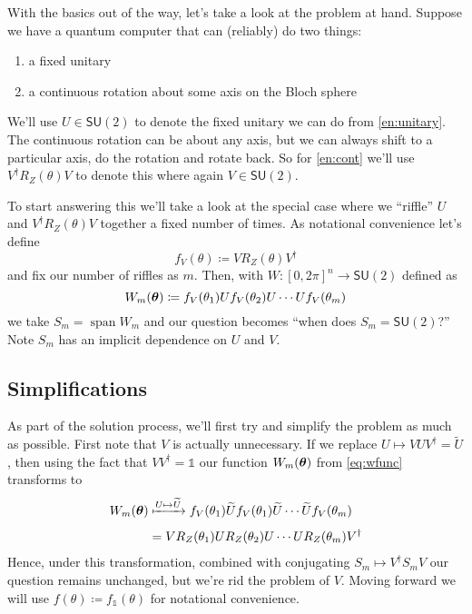 \documentclass[12pt,dvipsnames]{article}
\newcommand{\SU}[1]{\mathsf{SU} (#1)}
\newcommand{\1}{\mathbb{1}}
\DeclareMathOperator{\vspan}{span}
\theoremstyle{plain}
\begin{document}
With the basics out of the way, let's take a look at the problem at hand.
Suppose we have a quantum computer that can (reliably) do two things:
\begin{enumerate}
    \item a fixed unitary\label{en:unitary}
    \item a continuous rotation about some axis on the Bloch sphere\label{en:cont}
\end{enumerate}
We'll use $U\in \SU{2}$ to denote the fixed unitary we can do from \cref{en:unitary}. The continuous rotation can be about any axis, but we can always shift to a particular axis, do the rotation and rotate back. So for \cref{en:cont} we'll use $V^\dagger R_Z(\theta)V$ to denote this where again $V\in \SU{2}$.

To start answering this we'll take a look at the special case where we ``riffle'' $U$ and $V^\dagger R_Z(\theta)V$ together a fixed number of times. As notational convenience let's define
\begin{equation}
    f_V(\theta)\coloneqq VR_Z(\theta)V^\dagger
\end{equation}
and fix our number of riffles as $m$. Then, with $W:[0, 2\pi]^n\to\SU{2}$ defined as
\begin{equation}\label{eq:wfunc}
    W_m(\vb*{\theta}) \coloneqq f_V(\theta_1)Uf_V(\theta_2)U\cdots U f_V(\theta_m)
\end{equation}
we take $S_m = \vspan W_m$ and our question becomes ``when does $S_{m} = \SU{2}$?'' Note $S_m$ has an implicit dependence on $U$ and $V$.

\subsection{Simplifications}

As part of the solution process, we'll first try and simplify the problem as much as possible. First note that $V$ is actually unnecessary. If we replace $U\mapsto VUV^\dagger = \widetilde{U}$, then using the fact that $VV^\dagger = \1$ our function $W_m(\vb*{\theta})$ from \cref{eq:wfunc} transforms to
\begin{align*}
    W_m(\vb*{\theta}) & \xmapsto{U\mapsto \widetilde{U}} f_V(\theta_1)\widetilde{U}f_V(\theta_1)\widetilde{U}\cdots \widetilde{U}f_V(\theta_m) \\[0.4em]
                      & = VR_Z(\theta_1)U R_Z(\theta_2) U \cdots U R_Z(\theta_m)V^\dagger
\end{align*}
Hence, under this transformation, combined with conjugating $S_m\mapsto V^\dagger S_m V$ our question remains unchanged, but we're rid the problem of $V$. Moving forward we will use $f(\theta)\coloneqq f_\1(\theta)$ for notational convenience.
\end{document}
